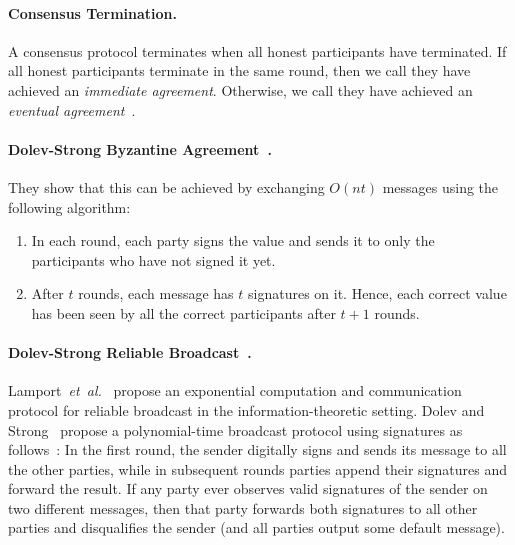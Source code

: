 \documentclass[11pt]{article}
\newcommand{\etal}{\textit{et~al.}}
\theoremstyle{mytheoremstyle}
\begin{document}
\paragraph{Consensus Termination.} A consensus protocol terminates when all honest participants have terminated. If all honest participants terminate in the same round, then we call they have achieved an \emph{immediate agreement}. Otherwise, we call they have achieved an \emph{eventual agreement}~\cite{fischer}.

\paragraph{Dolev-Strong Byzantine Agreement~\cite{dolev:strong:83}.}
They show that this can be achieved by exchanging $O(nt)$ messages using the following algorithm:
\begin{enumerate}
	\item In each round, each party signs the value and sends it to only the participants who have not signed it yet.
	\item After $t$ rounds, each message has $t$ signatures on it. Hence, each correct value has been seen by all the correct participants after $t+1$ rounds.
\end{enumerate}

\paragraph{Dolev-Strong Reliable Broadcast~\cite{dolev:strong:83}.} 
Lamport~\etal~\cite{lsp82} propose an exponential computation and communication protocol for reliable broadcast in the information-theoretic setting. Dolev and Strong~\cite{dolev:strong:83} propose a polynomial-time broadcast protocol using signatures as follows~\cite{cryptoeprint:2018:754}: In the first round, the sender digitally signs and sends its message to all the other parties, while in subsequent rounds parties append their signatures and forward the result. If any party ever observes valid signatures of the sender on two different messages, then that party forwards both signatures to all other parties and disqualifies the sender (and all parties output some default message).
\end{document}
